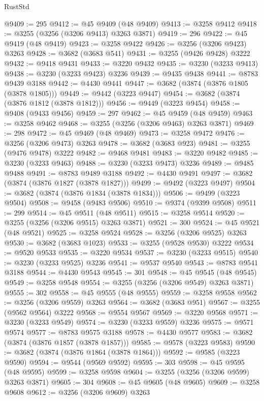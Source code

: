 \begin{lexlean}{RustStd}
\begin{coremodule}
@9409 := 295
@9412 := @45 @9409 (@48 @9409)
@9413 := @3258 @9412
@9418 := @3255 (@3256 (@3206 @9413) @3263 @3871)
@9419 := 296
@9422 := @45 @9419 (@48 @9419)
@9423 := @3258 @9422
@9426 := @3256 (@3206 @9423) @3263
@9428 := @3682 (@3683 @541)
@9431 := @3255 (@9426 @9428) @3222
@9432 := @9418 @9431
@9433 := @3220 @9432
@9435 := @3230 (@3233 @9413)
@9438 := @3230 (@3233 @9423) @3236
@9439 := @9435 @9438
@9441 := @8783 @9439 @3188
@9442 := @4430 @9441
@9447 := @3682 (@3874 (@3876 @1805 (@3878 @1805)))
@9449 := @9442 (@3223 @9447)
@9454 := @3682 (@3874 (@3876 @1812 (@3878 @1812)))
@9456 := @9449 (@3223 @9454)
@9458 := @9408 (@9433 @9456)
@9459 := 297
@9462 := @45 @9459 (@48 @9459)
@9463 := @3258 @9462
@9468 := @3255 (@3256 (@3206 @9463) @3263 @3871)
@9469 := 298
@9472 := @45 @9469 (@48 @9469)
@9473 := @3258 @9472
@9476 := @3256 (@3206 @9473) @3263
@9478 := @3682 (@3683 @923)
@9481 := @3255 (@9476 @9478) @3222
@9482 := @9468 @9481
@9483 := @3220 @9482
@9485 := @3230 (@3233 @9463)
@9488 := @3230 (@3233 @9473) @3236
@9489 := @9485 @9488
@9491 := @8783 @9489 @3188
@9492 := @4430 @9491
@9497 := @3682 (@3874 (@3876 @1827 (@3878 @1827)))
@9499 := @9492 (@3223 @9497)
@9504 := @3682 (@3874 (@3876 @1834 (@3878 @1834)))
@9506 := @9499 (@3223 @9504)
@9508 := @9458 (@9483 @9506)
@9510 := @9374 (@9399 @9508)
@9511 := 299
@9514 := @45 @9511 (@48 @9511)
@9515 := @3258 @9514
@9520 := @3255 (@3256 (@3206 @9515) @3263 @3871)
@9521 := 300
@9524 := @45 @9521 (@48 @9521)
@9525 := @3258 @9524
@9528 := @3256 (@3206 @9525) @3263
@9530 := @3682 (@3683 @1023)
@9533 := @3255 (@9528 @9530) @3222
@9534 := @9520 @9533
@9535 := @3220 @9534
@9537 := @3230 (@3233 @9515)
@9540 := @3230 (@3233 @9525) @3236
@9541 := @9537 @9540
@9543 := @8783 @9541 @3188
@9544 := @4430 @9543
@9545 := 301
@9548 := @45 @9545 (@48 @9545)
@9549 := @3258 @9548
@9554 := @3255 (@3256 (@3206 @9549) @3263 @3871)
@9555 := 302
@9558 := @45 @9555 (@48 @9555)
@9559 := @3258 @9558
@9562 := @3256 (@3206 @9559) @3263
@9564 := @3682 (@3683 @951)
@9567 := @3255 (@9562 @9564) @3222
@9568 := @9554 @9567
@9569 := @3220 @9568
@9571 := @3230 (@3233 @9549)
@9574 := @3230 (@3233 @9559) @3236
@9575 := @9571 @9574
@9577 := @8783 @9575 @3188
@9578 := @4430 @9577
@9583 := @3682 (@3874 (@3876 @1857 (@3878 @1857)))
@9585 := @9578 (@3223 @9583)
@9590 := @3682 (@3874 (@3876 @1864 (@3878 @1864)))
@9592 := @9585 (@3223 @9590)
@9594 := @9544 (@9569 @9592)
@9595 := 303
@9598 := @45 @9595 (@48 @9595)
@9599 := @3258 @9598
@9604 := @3255 (@3256 (@3206 @9599) @3263 @3871)
@9605 := 304
@9608 := @45 @9605 (@48 @9605)
@9609 := @3258 @9608
@9612 := @3256 (@3206 @9609) @3263

\end{coremodule}
\end{lexlean}
